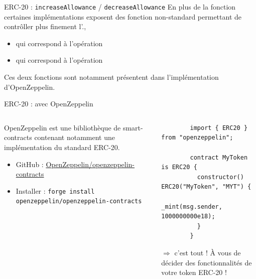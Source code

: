\begin{frame}[fragile]{ERC-20 : \texttt{increaseAllowance} / \texttt{decreaseAllowance}}
  En plus de la fonction  certaines implémentations exposent des fonction non-standard permettant de contrôller plus finement l'.,
  \begin{itemize}
    \item {} qui correspond à l'opération 
    \item {} qui correspond à l'opération 
  \end{itemize}

  Ces deux fonctions sont notamment présentent dans l'implémentation d'OpenZeppelin.
\end{frame}

\begin{frame}[fragile]{ERC-20 : avec OpenZeppelin}
  \begin{columns}
    \begin{column}{0.47\textwidth}
      \begin{center}

      \end{center}

      OpenZeppelin est une bibliothèque de smart-contracts contenant notamment une implémentation du standard ERC-20.

      \begin{itemize}
        \item GitHub : \href{https://github.com/OpenZeppelin/openzeppelin-contracts}{OpenZeppelin/openzeppelin-contracts}
        \item Installer : \texttt{forge install openzeppelin/openzeppelin-contracts}
      \end{itemize}
    \end{column}

    \hspace{0.03\textwidth}

    \begin{column}{0.47\textwidth}
      \begin{verbatim}
        import { ERC20 } from "openzeppelin";
  
        contract MyToken is ERC20 {
          constructor() ERC20("MyToken", "MYT") {
            _mint(msg.sender, 1000000000e18);
          }
        }
      \end{verbatim}

      $\Rightarrow$ c'est tout ! À vous de décider des fonctionnalités de votre token ERC-20 !
    \end{column}
  \end{columns}
\end{frame}

